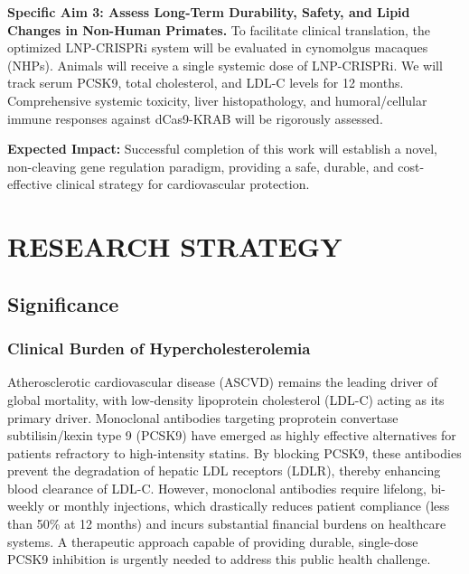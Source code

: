 \documentclass[11pt]{article}
\newcommand{\p}{\vspace{1.5mm}}
\begin{document}
\begin{aimsbox}
    \p
    \textbf{Specific Aim 3: Assess Long-Term Durability, Safety, and Lipid Changes in Non-Human Primates.}
    To facilitate clinical translation, the optimized LNP-CRISPRi system will be evaluated in cynomolgus macaques (NHPs). Animals will receive a single systemic dose of LNP-CRISPRi. We will track serum PCSK9, total cholesterol, and LDL-C levels for 12 months. Comprehensive systemic toxicity, liver histopathology, and humoral/cellular immune responses against dCas9-KRAB will be rigorously assessed.

    \p
    \textbf{Expected Impact:} Successful completion of this work will establish a novel, non-cleaving gene regulation paradigm, providing a safe, durable, and cost-effective clinical strategy for cardiovascular protection.
\end{aimsbox}

\clearpage

\section{RESEARCH STRATEGY}

\subsection{Significance}
\subsubsection{Clinical Burden of Hypercholesterolemia}
Atherosclerotic cardiovascular disease (ASCVD) remains the leading driver of global mortality, with low-density lipoprotein cholesterol (LDL-C) acting as its primary driver. Monoclonal antibodies targeting proprotein convertase subtilisin/kexin type 9 (PCSK9) have emerged as highly effective alternatives for patients refractory to high-intensity statins. By blocking PCSK9, these antibodies prevent the degradation of hepatic LDL receptors (LDLR), thereby enhancing blood clearance of LDL-C. However, monoclonal antibodies require lifelong, bi-weekly or monthly injections, which drastically reduces patient compliance (less than 50\% at 12 months) and incurs substantial financial burdens on healthcare systems. A therapeutic approach capable of providing durable, single-dose PCSK9 inhibition is urgently needed to address this public health challenge.

\p
\end{document}
